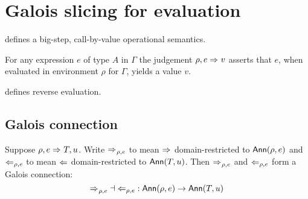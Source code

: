 \section{Galois slicing for evaluation}


% 

\begin{definition}
   \label{def:eval}
    defines a big-step, call-by-value operational
   semantics.
\end{definition}

For any expression $e$ of type $A$ in $\Gamma$ the judgement $\rho, e \mathrel{\Rightarrow_{}} v$
asserts that $e$, when evaluated in environment $\rho$ for $\Gamma$, yields a
value $v$.

\begin{definition}
   \label{def:uneval}
    defines reverse evaluation.
\end{definition}




\subsection{Galois connection}

\begin{theorem}
\label{thm:gc-eval}

Suppose $\rho, e \mathrel{\Rightarrow_{}} T, u$. Write $\mathrel{\Rightarrow_{}}_{\rho, e}$ to mean $\mathrel{\Rightarrow_{}}$
domain-restricted to $\textup{\textsf{Ann}}(\rho, e)$ and $\Leftarrow_{\rho, e}$ to mean $\Leftarrow$
domain-restricted to $\textup{\textsf{Ann}}(T, u)$. Then $\mathrel{\Rightarrow_{}}_{\rho, e}$ and $\Leftarrow_{\rho,
e}$ form a Galois connection: \[{\mathrel{\Rightarrow_{}}_{\rho, e}} \dashv {\Leftarrow_{\rho,
e}}: \textup{\textsf{Ann}}(\rho, e) \to \textup{\textsf{Ann}}(T, u)\]

\end{theorem}
